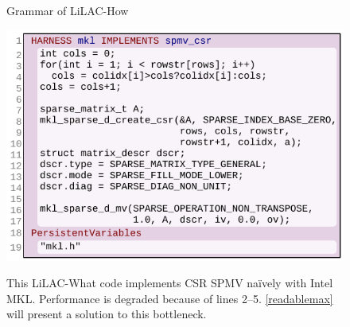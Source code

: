 \begin{figure}[t]
\centering

\vspace{-1.5em}
\caption{Grammar of LiLAC-How}
\label{lilacbnf2}
\vspace{0.8em}
\includegraphics[width=0.944\linewidth]{figures/harness2.pdf}
\\[-0.75em]
\caption{This LiLAC-What code implements CSR SPMV na\"ively with Intel MKL.
         Performance is degraded because of lines 2--5.
         \autoref{readablemax} will present a solution to this bottleneck.}
\vspace{2.em}
\label{mklharness1}
\end{figure}

